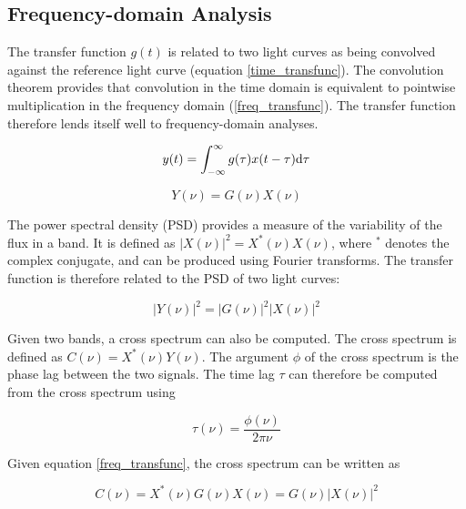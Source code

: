\documentclass[11pt,letterpaper]{article}
\begin{document}
    \subsection{Frequency-domain Analysis}
    \label{sec:freq_analysis}

    The transfer function $g(t)$ is related to two light curves as being convolved against the reference light curve (equation \ref{time_transfunc}). The convolution theorem provides that convolution in the time domain is equivalent to pointwise multiplication in the frequency domain (\ref{freq_transfunc}). The transfer function therefore lends itself well to frequency-domain analyses.

    \begin{equation}
        \label{time_transfunc}
        y(t) = \int_{-\infty}^{\infty} g(\tau) x(t-\tau)  {\rm d}\tau
    \end{equation}

    \begin{equation}
        \label{freq_transfunc}
        Y(\nu) = G(\nu) X(\nu)
    \end{equation}

    The power spectral density (PSD) provides a measure of the variability of the flux in a band. It is defined as $|X(\nu)|^2 = X^*(\nu)X(\nu)$, where $^*$ denotes the complex conjugate, and can be produced using Fourier transforms. The transfer function is therefore related to the PSD of two light curves:

    \begin{equation}
        |Y(\nu)|^2 = |G(\nu)|^2 |X(\nu)|^2
    \end{equation}

    Given two bands, a cross spectrum can also be computed. The cross spectrum is defined as $C(\nu) = X^*(\nu) Y(\nu)$. The argument $\phi$ of the cross spectrum is the phase lag between the two signals. The time lag $\tau$ can therefore be computed from the cross spectrum using

    \begin{equation}
        \tau(\nu) = \frac{\phi(\nu)}{2\pi\nu}
    \end{equation}

    Given equation \ref{freq_transfunc}, the cross spectrum can be written as

    \begin{equation}
        C(\nu) = X^*(\nu) G(\nu) X(\nu) =  G(\nu) |X(\nu)|^2
    \end{equation}
\end{document}
